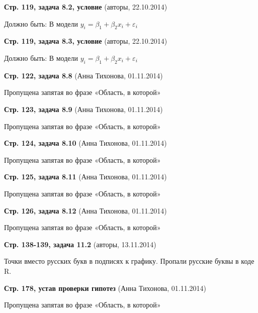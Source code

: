 \documentclass[12pt]{article} %
\newcommand{\erroronpage}[4]{\textbf{Стр. #1, #2} (#3, #4)}
\begin{document}
\erroronpage{119}{задача 8.2, условие}{авторы}{22.10.2014}

Должно быть: В модели $y_i=\beta_1 + \beta_2 x_i +\varepsilon_i$

\erroronpage{119}{задача 8.3, условие}{авторы}{22.10.2014}

Должно быть: В модели $y_i=\beta_1 + \beta_2 x_i +\varepsilon_i$

\erroronpage{122}{задача 8.8}{Анна Тихонова}{01.11.2014}

Пропущена запятая во фразе «Область, в которой»

\erroronpage{123}{задача 8.9}{Анна Тихонова}{01.11.2014}

Пропущена запятая во фразе «Область, в которой»

\erroronpage{124}{задача 8.10}{Анна Тихонова}{01.11.2014}

Пропущена запятая во фразе «Область, в которой»

\erroronpage{125}{задача 8.11}{Анна Тихонова}{01.11.2014}

Пропущена запятая во фразе «Область, в которой»

\erroronpage{126}{задача 8.12}{Анна Тихонова}{01.11.2014}

Пропущена запятая во фразе «Область, в которой»

\erroronpage{138-139}{задача 11.2}{авторы}{13.11.2014}

Точки вместо русских букв в подписях к графику. Пропали русские буквы в коде R.

\erroronpage{178}{устав проверки гипотез}{Анна Тихонова}{01.11.2014}

Пропущена запятая во фразе «Область, в которой»
\end{document}
